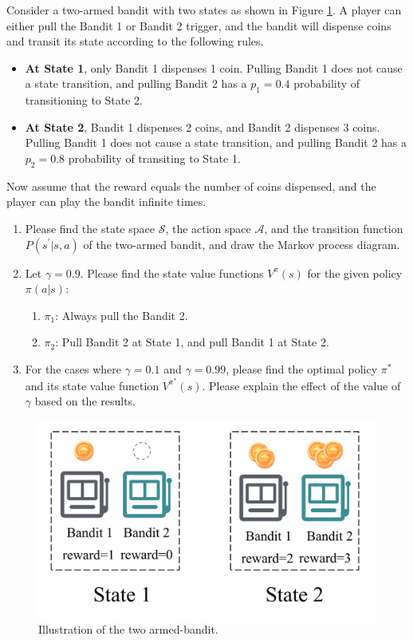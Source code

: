 \documentclass[11pt,letter,notitlepage]{article}
\begin{document}
\newpage
\begin{exercise}\label{exercise:bandit}
Consider a two-armed bandit with two states as shown in Figure \ref{fig:bandit}. A player can either pull the Bandit 1 or Bandit 2 trigger, and the bandit will dispense coins and transit its state according to the following rules.
\begin{itemize}
    \item \textbf{At State 1}, only Bandit 1 dispenses 1 coin. Pulling Bandit 1 does not cause a state transition, and pulling Bandit 2 has a $p_1=0.4$ probability of transitioning to State 2.
    \item \textbf{At State 2}, Bandit 1 dispenses 2 coins, and Bandit 2 dispenses 3 coins. Pulling Bandit 1 does not cause a state transition, and pulling Bandit 2 has a $p_2=0.8$ probability of transiting to State 1.
\end{itemize}
Now assume that the reward equals the number of coins dispensed, and the player can play the bandit infinite times.

\begin{enumerate}
    \item Please find the state space $\mathcal{S}$, the action space $\mathcal{A}$, and the transition function $P(s^\prime|s, a)$ of the two-armed bandit, and draw the Markov process diagram.
    \item Let $\gamma=0.9$. Please find the state value functions $V^{\pi}(s)$ for the given policy $\pi(a|s)$: 
    \begin{enumerate}
        \item $\pi_1$: Always pull the Bandit 2.
        \item $\pi_2$: Pull Bandit 2 at State 1, and pull Bandit 1 at State 2.
    \end{enumerate}
    \item For the cases where $\gamma=0.1$ and $\gamma=0.99$, please find the optimal policy $\pi^*$ and its state value function $V^{\pi^*}(s)$. Please explain the effect of the value of $\gamma$ based on the results. 
\end{enumerate}

\end{exercise}

\begin{figure}[h]
	\centering
	\includegraphics[width=.6\textwidth]{Figures/2024-fall-Bandit.png}
	\caption{Illustration of the two armed-bandit.}\label{fig:bandit}
\end{figure}


% 
%

\end{document}
